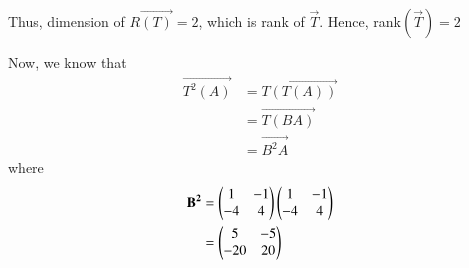 \documentclass[journal,12pt,twocolumn]{IEEEtran}
\begin{document}
Thus, dimension of $R\vec{(T)} =2$, which is rank of $\vec{T}$. Hence, rank$(\vec{T})=2$ 

Now, we know that
\begin{align}
\vec{T^2(A)} & = \vec{T(T(A))} \\
             & = \vec{T(BA)} \\
             & = \vec{B^2A}
\end{align}
where
\begin{align}
\mathbf{B^2} & = \begin{pmatrix}1 & -1 \\ -4 & 4\end{pmatrix}\begin{pmatrix}1 & -1 \\ -4 & 4\end{pmatrix} \\
          & = \begin{pmatrix}5 & -5 \\ -20 & 20\end{pmatrix}
\end{align}
\end{document}
